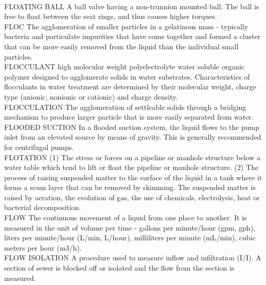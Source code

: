 \vspace{0.3cm}\\
FLOATING BALL
A ball valve having a non-trunnion mounted ball. The ball is free to float between the seat rings, and thus causes higher torques.
\vspace{0.3cm}\\
FLOC
The agglomeration of smaller particles in a gelatinous mass - typically bacteria and particulate impurities that have come together and formed a cluster that can be more easily removed from the liquid than the individual small particles.
\vspace{0.3cm}\\
FLOCCULANT
high molecular weight polyelectrolyte water soluble organic polymer designed to agglomerate solids in water substrates. Characteristics of flocculants in water treatment are determined by their molecular weight, charge type (anionic, nonionic or cationic) and charge density.
\vspace{0.3cm}\\
FLOCCULATION
The agglomeration of settleable solids through a bridging mechanism to produce larger particle that is more easily separated from water.
\vspace{0.3cm}\\
FLOODED SUCTION
In a flooded suction system, the liquid flows to the pump inlet from an elevated source by means of gravity. This is generally recommended for centrifugal pumps.
\vspace{0.3cm}\\
FLOTATION
(1) The stress or forces on a pipeline or manhole structure below a water table which tend to lift or float the pipeline or manhole structure. (2) The process of raising suspended matter to the surface of the liquid in a tank where it forms a scum layer that can be removed by skimming. The suspended matter is raised by aeration, the evolution of gas, the use of chemicals, electrolysis, heat or bacterial decomposition. 
\vspace{0.3cm}\\
FLOW
The continuous movement of a liquid from one place to another. It is measured in the unit of volume per time - gallons per minute/hour (gpm, gph), liters per minute/hour (L/min, L/hour), milliliters per minute (mL/min), cubic meters per hour (m3/h). 
\vspace{0.3cm}\\
FLOW ISOLATION
A procedure used to measure inflow and infiltration (I/I). A section of sewer is blocked off or isolated and the flow from the section is measured. 
